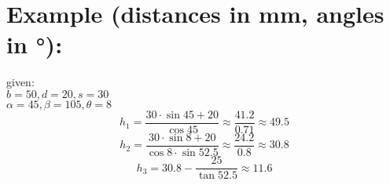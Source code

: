 \documentclass[a4paper,10pt]{report}
\begin{document}
\section*{Example (distances in mm, angles in °):}
\begin{minipage}{0.65\textwidth}
given: \\
$b=50, d=20, s=30$ \\ $\alpha=45, \beta=105, \theta=8 $
$$
    h_1 = \frac{30 \cdot \sin 45  + 20}{\cos 45} \approx \frac{41.2}{0.71} \approx 49.5
$$
$$
    h_2 = \frac{30 \cdot \sin 8  + 20}{\cos 8 \cdot \sin 52.5} \approx \frac{24.2}{0.8} \approx 30.8
$$
$$
    h_3 = 30.8 - \frac{25}{\tan 52.5} \approx 11.6
$$

\end{minipage}
\begin{minipage}{0.25\textwidth}
\end{minipage}
\end{document}

